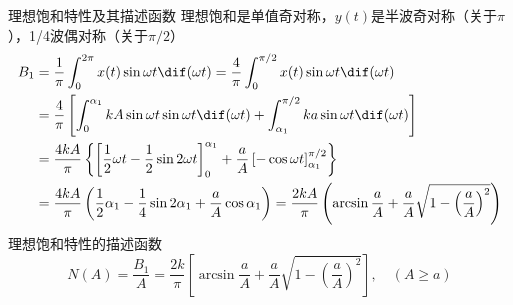 \documentclass[handout,cjkutf8,table,aspectratio=1610]{beamer} %
\begin{document}
\begin{frame}{理想饱和特性及其描述函数}\vs{-0.5em}
	理想饱和是单值奇对称，$y(t)$是半波奇对称（关于$\pi$），1/4波偶对称（关于$\pi/2$）
	{\begin{align*}
		B_1	&= \frac{1}{\pi}\int_{0}^{2\pi}x(t)\sin\omega t\dif(\omega t)=\frac{4}{\pi}\int_0^{\pi/2}x(t)\sin\omega t\dif(\omega t)\\
			&= \frac{4}{\pi}\left[\int_0^{\alpha_1}kA\sin\omega t\sin\omega t \dif(\omega t)+\int_{\alpha_1}^{\pi/2}ka\sin\omega t\dif(\omega t)\right]\\
			&= \frac{4kA}{\pi}\left\{\left[\frac{1}{2}\omega t-\frac{1}{2}\sin2\omega t\right]_0^{\alpha_1}+\frac{a}{A}\left[-\cos\omega t\right]_{\alpha_1}^{\pi/2}\right\}\\
			&= \frac{4kA}{\pi}\left(\frac{1}{2}\alpha_1-\frac{1}{4}\sin2\alpha_1+\frac{a}{A}\cos\alpha_1\right) = \frac{2kA}{\pi}\left(\arcsin\frac{a}{A}+\frac{a}{A}\sqrt{1-\left(\frac{a}{A}\right)^2}\right)
	\end{align*}}
	理想饱和特性的描述函数
	$$N(A)=\frac{B_1}{A}=\frac{2k}{\pi}\left[\arcsin\frac{a}{A}+\frac{a}{A}\sqrt{1-\left(\frac{a}{A}\right)^2}\right],\quad (A\ge a)$$
\end{frame}
\end{document}
